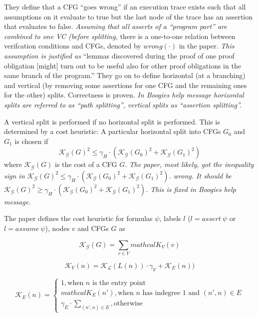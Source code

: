 \documentclass{scrartcl}
\begin{document}
They define that a CFG \enquote{goes wrong} if an execution trace exists
such that all assumptions on it evaluate to true but the last node of the trace has an assertion
that evaluates to false.
\textit{Assuming that all asserts of a \enquote{program part} are combined to one VC
(before splitting,}
there is a one-to-one relation between verifcation conditions and CFGs,
denoted by \(wrong(\cdot)\) in the paper.
\textit{This assumption is justified as }
\enquote{lemmas discovered during the proof of one proof obligation [might] turn out to be useful    
also for other proof obligations in the same branch of the program.}
They go on to define horizontal (at a branching) and vertical
(by removing some assertions for one CFG and the remaining ones for the other) splits.
Correctness is proven.
\textit{In Boogies help message horizontal splits are referred to as \enquote{path splitting},
    vertical splits as \enquote{assertion splitting}.}


A vertical split is performed if no horizontal split is performed.
This is determined by a cost heuristic:
A particular horizontal split into CFGs \(G_0\) and \(G_1\) is chosen if 
\[
    \mathcal{K}_\mathcal{G}(G)^2 \le \gamma_H
    \cdot (\mathcal{K}_\mathcal{G}(G_0)^2 + \mathcal{K}_\mathcal{G}(G_1)^2)
\]
where \(\mathcal{K}_\mathcal{G}(G)\) is the cost of a CFG \(G\).
\textit{The paper, most likely, got the inequality sign in
    \(\mathcal{K}_\mathcal{G}(G)^2 \le \gamma_H
    \cdot (\mathcal{K}_\mathcal{G}(G_0)^2 + \mathcal{K}_\mathcal{G}(G_1)^2)\).
    wrong. It should be
    \(\mathcal{K}_\mathcal{G}(G)^2 \ge \gamma_H
    \cdot (\mathcal{K}_\mathcal{G}(G_0)^2 + \mathcal{K}_\mathcal{G}(G_1)^2)\).
    This is fixed in Boogies help message.
}

The paper defines the cost heuristic for formulas \(\psi\),
labels \(l\) (\(l = assert\ \psi\) or \(l = assume\ \psi\)),
nodes \(v\) and CFGs \(G\) as

\[\mathcal{K}_\mathcal{G}(G) = \sum_{v\in V} mathcal{K}_V(v)\]
        
\[\mathcal{K}_V(n) = \mathcal{K}_\mathcal{L}(L(n)) \cdot \gamma_V + \mathcal{K}_E(n))\]
    
\[\mathcal{K}_E(n) =
    \begin{cases}
        1, \text{when \(n\) is the entry point}\\
        mathcal{K}_E(n'), \text{when \(n\) has indegree 1 and \((n', n) \in E\)}\\
        \gamma_E \cdot \sum_{(n', n) \in E}, \text{otherwise}
    \end{cases}
\]
\end{document}
